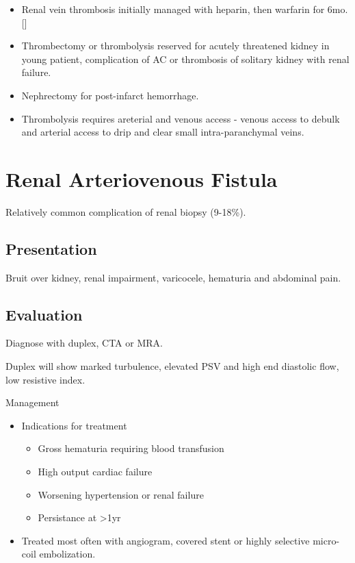 \documentclass[
]{book}
\begin{document}
\begin{itemize}
\item
  Renal vein thrombosis initially managed with heparin, then warfarin
  for 6mo. {[}\citep{asgharRenalVeinThrombosis2007, velazquez-ramirez129RenovascularDisease2019}{]}
\item
  Thrombectomy or thrombolysis reserved for acutely threatened kidney
  in young patient, complication of AC or thrombosis of solitary
  kidney with renal failure.
\item
  Nephrectomy for post-infarct hemorrhage.
\item
  Thrombolysis requires areterial and venous access - venous access to
  debulk and arterial access to drip and clear small intra-paranchymal
  veins.
\end{itemize}

\hypertarget{renal-arteriovenous-fistula}{%
\section{Renal Arteriovenous Fistula}\label{renal-arteriovenous-fistula}}

Relatively common complication of renal biopsy (9-18\%).
\citep{schwarzCourseRelevanceArteriovenous2008}

\hypertarget{presentation-11}{%
\subsection{Presentation}\label{presentation-11}}

Bruit over kidney, renal impairment, varicocele, hematuria and abdominal
pain. \citep{hunter174AcquiredArteriovenous2019}

\hypertarget{evaluation-16}{%
\subsection{Evaluation}\label{evaluation-16}}

Diagnose with duplex, CTA or MRA.

Duplex will show marked turbulence, elevated PSV and high end diastolic
flow, low resistive index. \citep{ozbekImagedirectedColorDoppler1995}

Management

\begin{itemize}
\item
  Indications for treatment \citep{merkusHighIncidenceArteriovenous2005, morimotoUniqueCaseRenovascular1995}

  \begin{itemize}
  \item
    Gross hematuria requiring blood transfusion
  \item
    High output cardiac failure
  \item
    Worsening hypertension or renal failure
  \item
    Persistance at \textgreater1yr
  \end{itemize}
\item
  Treated most often with angiogram, covered stent or highly selective
  micro-coil embolization. \citep{ginatTranscatheterRenalArtery2009, saliouIdiopathicRenalArteriovenous1998}
\end{itemize}
\end{document}
